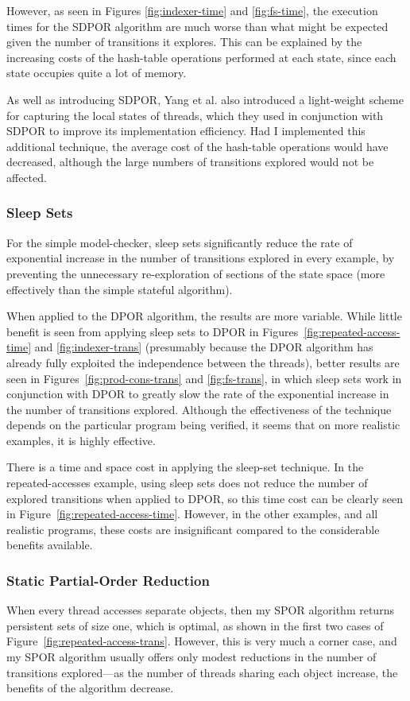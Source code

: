 \documentclass[12pt,a4paper,twoside,openright]{report}
\begin{document}
However, as seen in Figures
\ref{fig:indexer-time} and \ref{fig:fs-time},
the execution times for the SDPOR algorithm
are much worse than what might be
expected given the number of
transitions it explores.
This can be explained by the increasing
costs of the hash-table operations
performed at each state, since each
state occupies quite a lot of memory.

As well as introducing SDPOR, Yang et al.\@
also introduced a light-weight
scheme for capturing the local states of
threads, which they used in conjunction with
SDPOR to improve its implementation efficiency.
Had I implemented this additional
technique, the average cost of the hash-table
operations would have decreased, although
the large numbers of transitions explored
would not be affected.

\subsubsection{Sleep Sets}
For the simple model-checker,
sleep sets significantly reduce the
rate of exponential increase in
the number of transitions explored in every example,
by preventing the
unnecessary re-exploration of sections
of the state space (more effectively
than the simple stateful algorithm).

When applied to the DPOR algorithm, the results
are more variable. While little benefit is seen
from applying sleep sets to DPOR in
Figures~\ref{fig:repeated-access-time}
and \ref{fig:indexer-trans}
(presumably because the DPOR algorithm has already
fully exploited the independence between the threads),
better results are seen in 
Figures~\ref{fig:prod-cons-trans} and \ref{fig:fs-trans},
in which sleep sets work
in conjunction with DPOR to greatly
slow the rate of the exponential increase in the
number of transitions explored.
Although the effectiveness of the technique
depends on the particular program being
verified, it seems that on more realistic
examples, it is highly effective.

There is a time and space cost in
applying the sleep-set technique.
In the repeated-accesses example,
using sleep sets does not reduce the number
of explored transitions when applied
to DPOR, so this time cost can be clearly
seen in Figure~\ref{fig:repeated-access-time}.
However, in the other examples, and all
realistic programs, these
costs are insignificant compared
to the considerable benefits available.

\subsubsection{Static Partial-Order Reduction}
When every thread accesses separate objects,
then my SPOR algorithm returns persistent sets
of size one, which is optimal, as shown in the
first two cases of
Figure~\ref{fig:repeated-access-trans}.
However, this is very much a corner case,
and my SPOR algorithm usually offers only
modest reductions in the number of transitions
explored---as the number of threads sharing
each object increase, the benefits of the
algorithm decrease.
\end{document}
